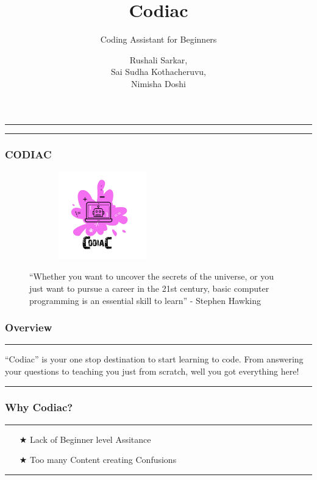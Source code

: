 \documentclass[14pt]{beamer}
\title[Codiac]{Codiac}
\subtitle[Coding Assitant]{Coding Assistant for Beginners}
\author[Team 2]{Rushali Sarkar, \\ Sai Sudha Kothacheruvu, \\ Nimisha Doshi}
\begin{document}
\begin{frame}
    \noindent
    {\color{pink} \rule{\linewidth}{0.7mm} }
    \titlepage
    \noindent
    {\color{pink} \rule{\linewidth}{0.7mm} }
\end{frame}


\begin{frame}
    \frametitle{CODIAC}
    \begin{figure}[htbp]
        \centerline{\includegraphics[width=2.5in, height=1.5in]{./logos/logo.jpeg}}
        \begin{spacing}{0.25}
        {\small 
        ``Whether you want to uncover the secrets of the universe, 
        or you just want to pursue a career in the 21st century, 
        basic computer programming is an essential skill to learn'' 
        \linebreak - Stephen Hawking}
        \end{spacing}
    \end{figure}
\end{frame}


\begin{frame}
    \frametitle{Overview}
    \noindent
    {\color{pink} \rule{\linewidth}{0.7mm} }
    ``Codiac'' is your one stop destination to start learning to code. From answering your questions to teaching you just from scratch, well you got everything here!
    \noindent
    {\color{pink} \rule{\linewidth}{0.7mm} }
\end{frame}

\begin{frame}
    \frametitle{Why Codiac?}
    \noindent
    {\color{pink} \rule{\linewidth}{0.7mm} }
    \begin{itemize}
    \item [$\bigstar$] Lack of Beginner level Assitance \\
        \pause
    \item [$\bigstar$] Too many Content creating Confusions \\
    \end{itemize}
    \noindent
     {\color{pink} \rule{\linewidth}{0.7mm}}
\end{frame}
\end{document}
